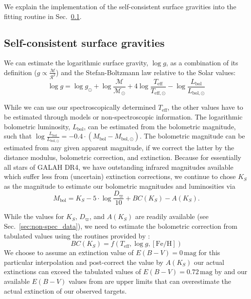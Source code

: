 \documentclass[
  journal=pasa,
  manuscript=research-paper, %
  year=2023,
  volume=37
]{cup-journal}
\begin{document}
We explain the implementation of the self-consistent surface gravities into the fitting routine in Sec.~\ref{sec:logg_phot}.

\subsection{Self-consistent surface gravities} \label{sec:logg_phot}

We can estimate the logarithmic surface gravity, $\log g$, as a combination of its definition ($g \propto \frac{\mathcal{M}}{\mathcal{R}^2}$) and the Stefan-Boltzmann law relative to the Solar values:
\begin{equation}
\log g = \log g_\odot + \log \frac{\mathcal{M}}{\mathcal{M_\odot}} + 4 \log \frac{T_\mathrm{eff}}{T_\mathrm{eff,\odot}} - \log \frac{L_\mathrm{bol}}{L_\mathrm{bol,\odot}} \label{eq:logg}
\end{equation}

While we can use our spectroscopically determined $T_\mathrm{eff}$, the other values have to be estimated through models or non-spectroscopic information. The logarithmic bolometric luminosity, $L_\mathrm{bol}$, can be estimated from the bolometric magnitude, such that $\log \frac{L_\mathrm{bol}}{L_\mathrm{bol,\odot}} = -0.4 \cdot \left(M_\mathrm{bol} - M_\mathrm{bol,\odot} \right)$. The bolometric magnitude can be estimated from any given apparent magnitude, if we correct the latter by the distance modulus, bolometric correction, and extinction. Because for essentially all stars of GALAH DR4, we have outstanding infrared magnitudes available which suffer less from (uncertain) extinction corrections, we continue to chose $K_S$ as the magnitude to estimate our bolometric magnitudes and luminosities via
\begin{equation}
M_\mathrm{bol} = K_S - 5\cdot \log \frac{D_\varpi}{10} + BC(K_S) - A(K_S). \label{eq:mbol}
\end{equation}

While the values for $K_S$, $D_\varpi$, and $A(K_S)$ are readily available (see Sec.~\ref{sec:non-spec_data}), we need to estimate the bolometric correction from tabulated values using the routines provided by \citet{Casagrande2018}:
\begin{equation}
BC(K_S) = f(T_\mathrm{eff}, \log g, \mathrm{[Fe/H]})
\label{eq:bc_ks}
\end{equation}
We choose to assume an extinction value of $E(B-V) = 0\,\mathrm{mag}$ for this particular interpolation and post-correct the value by $A(K_S)$ our actual extinctions can exceed the tabulated values of $E(B-V) = 0.72\,\mathrm{mag}$ by \citet{Casagrande2018} and our available $E(B-V)$ values from \citet{Schlegel1998} are upper limits that can overestimate the actual extinction of our observed targets.
\end{document}
